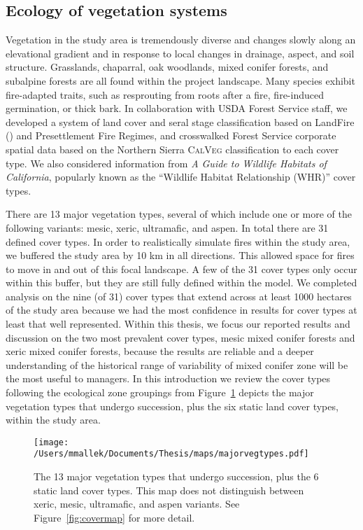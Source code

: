 \subsection{Ecology of vegetation systems}
Vegetation in the study area is tremendously diverse and changes slowly along an elevational gradient and in response to local changes in drainage, aspect, and soil structure. Grasslands, chaparral, oak woodlands, mixed conifer forests, and subalpine forests are all found within the project landscape. Many species exhibit fire-adapted traits, such as resprouting from roots after a fire, fire-induced germination, or thick bark. In collaboration with USDA Forest Service staff, we developed a system of land cover and seral stage classification based on LandFire (\mbox{}) and \citet[]['s]{VandeWater2011}  Presettlement Fire Regimes, and crosswalked Forest Service corporate spatial data based on the Northern Sierra \textsc{CalVeg} classification to each cover type. We also considered information from \emph{A Guide to Wildlife Habitats of California}, popularly known as the ``Wildlife Habitat Relationship (WHR)'' cover types. 

There are 13 major vegetation types, several of which include one or more of the following variants: mesic, xeric, ultramafic, and aspen. In total there are 31 defined cover types. In order to realistically simulate fires within the study area, we buffered the study area by 10 km in all directions. This allowed space for fires to move in and out of this focal landscape. A few of the 31 cover types only occur within this buffer, but they are still fully defined within the model. We completed analysis on the nine (of 31) cover types that extend across at least 1000 hectares of the study area because we had the most confidence in results for cover types at least that well represented. Within this thesis, we focus our reported results and discussion on the two most prevalent cover types, mesic mixed conifer forests and xeric mixed conifer forests, because the results are reliable and a deeper understanding of the historical range of variability of mixed conifer zone will be the most useful to managers. In this introduction we review the cover types following the ecological zone groupings from \citet{VanWag2006} Figure~\ref{majorvegtypes} depicts the major vegetation types that undergo succession, plus the six static land cover types, within the study area. 

\begin{figure}[!htbp]
\texttt{[image: /Users/mmallek/Documents/Thesis/maps/majorvegtypes.pdf]}
\caption{The 13 major vegetation types that undergo succession, plus the 6 static land cover types. This map does not distinguish between xeric, mesic, ultramafic, and aspen variants. See Figure~\ref{fig:covermap} for more detail.}
\label{majorvegtypes}
\end{figure}

